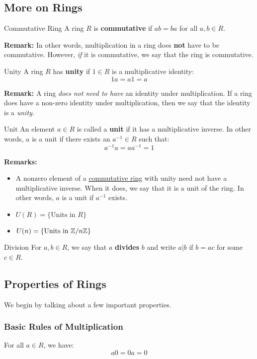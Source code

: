 \documentclass[letterpaper]{article}
\begin{document}
\subsection{More on Rings}
\begin{definition}{Commutative Ring}{}
    A ring $R$ is \textbf{commutative} if $ab = ba$ for all $a, b \in R$.
\end{definition}
\textbf{Remark:} In other words, multiplication in a ring does \textbf{not} have to be commutative. However, \emph{if} it is commutative, we say that the ring is commutative.

\begin{definition}{Unity}{}
    A ring $R$ has \textbf{unity} if $1 \in R$ is a multiplicative identity: 
    \[1a = a1 = a\]
\end{definition}
\textbf{Remark:} A ring \emph{does not need to have} an identity under multiplication. If a ring does have a non-zero identity under multiplication, then we say that the identity is a \emph{unity}.

\begin{definition}{Unit}{}
    An element $a \in R$ is called a \textbf{unit} if it has a multiplicative inverse. In other words, $a$ is a unit if there exists an $a^{-1} \in R$ such that: 
    \[a^{-1}a = aa^{-1} = 1\]
\end{definition}
\textbf{Remarks:}
\begin{itemize}
    \item A nonzero element of a \underline{commutative ring} with unity need not have a multiplicative inverse. When it does, we say that it is a unit of the ring. In other words, $a$ is a unit if $a^{-1}$ exists. 
    \item $U(R) = \{\text{Units in } R\}$
    \item $U(n) = \{\text{Units in } \mathbb{Z} / n\mathbb{Z}\}$
\end{itemize}

\begin{definition}{Division}{}
    For $a, b \in R$, we say that $a$ \textbf{divides} $b$ and write $a | b$ if $b = ac$ for some $c \in R$.
\end{definition}

\subsection{Properties of Rings}
We begin by talking about a few important properties. 




\subsubsection{Basic Rules of Multiplication}
\begin{theorem}{}{}
    For all $a \in R$, we have: 
    \[a0 = 0a = 0\]
\end{theorem}
\end{document}
